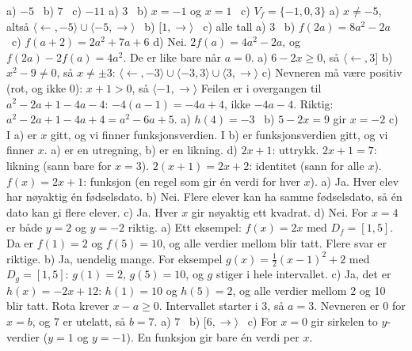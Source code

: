 
 a) $-5$ \ b) $7$ \ c) $-11$
 a) $3$ \ b) $x = -1$ og $x = 1$ \ c) $V_f = \{-1, 0, 3\}$
 a) $x \neq -5$, altså $\langle\leftarrow, -5\rangle \cup \langle -5, \rightarrow\rangle$ \ b) $[1, \rightarrow\rangle$ \ c) alle tall
 a) $3$ \ b) $f(2a) = 8a^2 - 2a$ \ c) $f(a+2) = 2a^2 + 7a + 6$
d) Nei. $2f(a) = 4a^2 - 2a$, og $f(2a) - 2f(a) = 4a^2$. De er like bare når $a = 0$.
 a) $6 - 2x \ge 0$, så $\langle\leftarrow, 3]$
b) $x^2 - 9 \neq 0$, så $x \neq \pm 3$: $\langle\leftarrow, -3\rangle \cup \langle -3, 3\rangle \cup \langle 3, \rightarrow\rangle$
c) Nevneren må være positiv (rot, og ikke 0): $x + 1 > 0$, så $\langle -1, \rightarrow\rangle$
 Feilen er i overgangen til $a^2 - 2a + 1 - 4a - 4$: $-4(a-1) = -4a + 4$, ikke $-4a - 4$. Riktig: $a^2 - 2a + 1 - 4a + 4 = a^2 - 6a + 5$.
 a) $h(4) = -3$ \ b) $5 - 2x = 9$ gir $x = -2$
c) I a) er $x$ gitt, og vi finner funksjonsverdien. I b) er funksjonsverdien gitt, og vi finner $x$. a) er en utregning, b) er en likning.
d) $2x+1$: uttrykk. $2x+1=7$: likning (sann bare for $x=3$). $2(x+1)=2x+2$: identitet (sann for alle $x$). $f(x)=2x+1$: funksjon (en regel som gir én verdi for hver $x$).
 a) Ja. Hver elev har nøyaktig én fødselsdato.
b) Nei. Flere elever kan ha samme fødselsdato, så én dato kan gi flere elever.
c) Ja. Hver $x$ gir nøyaktig ett kvadrat.
d) Nei. For $x = 4$ er både $y = 2$ og $y = -2$ riktig.
 a) Ett eksempel: $f(x) = 2x$ med $D_f = [1, 5]$. Da er $f(1) = 2$ og $f(5) = 10$, og alle verdier mellom blir tatt. Flere svar er riktige.
b) Ja, uendelig mange. For eksempel $g(x) = \frac{1}{2}(x-1)^2 + 2$ med $D_g = [1, 5]$: $g(1) = 2$, $g(5) = 10$, og $g$ stiger i hele intervallet.
c) Ja, det er $h(x) = -2x + 12$: $h(1) = 10$ og $h(5) = 2$, og alle verdier mellom 2 og 10 blir tatt.
 Rota krever $x - a \ge 0$. Intervallet starter i 3, så $a = 3$. Nevneren er 0 for $x = b$, og 7 er utelatt, så $b = 7$.
 a) $7$ \ b) $[6, \rightarrow\rangle$ \ c) For $x = 0$ gir sirkelen to $y$-verdier ($y = 1$ og $y = -1$). En funksjon gir bare én verdi per $x$.

